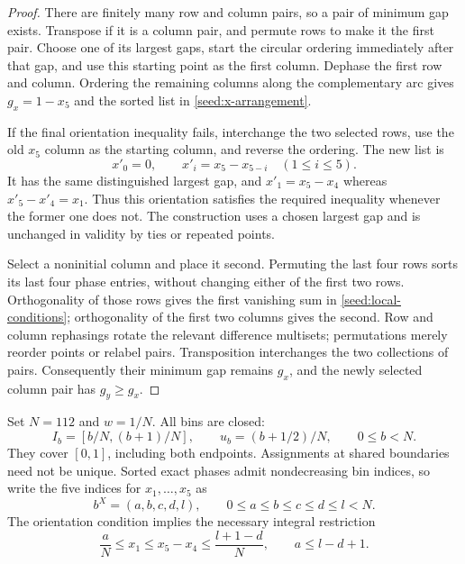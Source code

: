 \begin{proof}
There are finitely many row and column pairs, so a pair of minimum gap
exists.  Transpose if it is a column pair, and permute rows to make it the
first pair.  Choose one of its largest gaps, start the circular ordering
immediately after that gap, and use this starting point as the first
column.  Dephase the first row and column.  Ordering the remaining columns
along the complementary arc gives $g_x=1-x_5$ and the sorted list in
\eqref{seed:x-arrangement}.

If the final orientation inequality fails, interchange the two selected
rows, use the old $x_5$ column as the starting column, and reverse the
ordering.  The new list is
\[
 x'_0=0,\qquad x'_i=x_5-x_{5-i}\quad(1\le i\le5).
\]
It has the same distinguished largest gap, and
$x'_1=x_5-x_4$ whereas $x'_5-x'_4=x_1$.  Thus this orientation satisfies
the required inequality whenever the former one does not.  The construction
uses a chosen largest gap and is unchanged in validity by ties or repeated
points.

Select a noninitial column and place it second.  Permuting the last four
rows sorts its last four phase entries, without changing either of the first
two rows.  Orthogonality of those rows gives the first vanishing sum in
\eqref{seed:local-conditions}; orthogonality of the first two columns gives
the second.  Row and column rephasings rotate the relevant difference
multisets; permutations merely reorder points or relabel pairs.  Transposition
interchanges the two collections of pairs.  Consequently their minimum
gap remains $g_x$, and the newly selected column pair has $g_y\ge g_x$.
\end{proof}

Set $N=112$ and $w=1/N$.  All bins are closed:
\begin{equation}
\label{seed:bins}
 I_b=[b/N,(b+1)/N],\qquad
 u_b=(b+1/2)/N,\qquad 0\le b<N.
\end{equation}
They cover $[0,1]$, including both endpoints.  Assignments at shared
boundaries need not be unique.  Sorted exact phases admit nondecreasing
bin indices, so write the five indices for $x_1,\ldots,x_5$ as
\[
 b^X=(a,b,c,d,l),\qquad 0\le a\le b\le c\le d\le l<N.
\]
The orientation condition implies the necessary integral restriction
\begin{equation}
\label{seed:orientation-filter}
 \frac aN\le x_1\le x_5-x_4\le\frac{l+1-d}{N},
 \qquad a\le l-d+1.
\end{equation}

